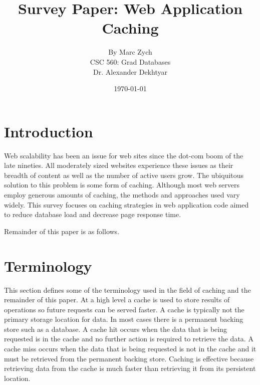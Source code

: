 \documentclass[12pt]{article}
\begin{document}
\title{\vfill Survey Paper: Web Application Caching}

\author{
By Marc Zych \vspace{10pt} \\
CSC 560: Grad Databases \vspace{10pt} \\
Dr. Alexander Dekhtyar \vspace{10pt} \\
}
\date{\today}

\maketitle


\thispagestyle{empty}
\newpage



\section{Introduction}
Web scalability has been an issue for web sites since the dot-com boom of the late nineties.
All moderately sized websites experience these issues as their breadth of content as well as the number of active users grow.
The ubiquitous solution to this problem is some form of caching.
Although most web servers employ generous amounts of caching, the methods and approaches used vary widely.
This survey focuses on caching strategies in web application code aimed to reduce database load and decrease page response time.


Remainder of this paper is as follows. %

\section{Terminology}
This section defines some of the terminology used in the field of caching and the remainder of this paper.
At a high level a cache is used to store results of operations so future requests can be served faster.
A cache is typically not the primary storage location for data.
In most cases there is a permanent backing store such as a database.
A cache hit occurs when the data that is being requested is in the cache and no further action is required to retrieve the data.
A cache miss occurs when the data that is being requested is not in the cache and it must be retrieved from the permanent backing store.
Caching is effective because retrieving data from the cache is much faster than retrieving it from its persistent location.
\end{document}
